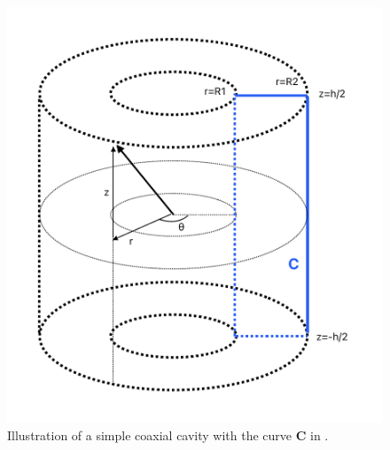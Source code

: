 \documentclass{article}
\begin{document}
\begin{figure}[H]
    \centering
    \includegraphics[width=.55\textwidth]{../../../figures/illustrations/rhodo_integral_curve.pdf}
    \vspace{20pt}
    \caption{Illustration of a simple coaxial cavity with the curve \textbf{C} in .}
    \label{fig:int_curve}
\end{figure}
\end{document}
